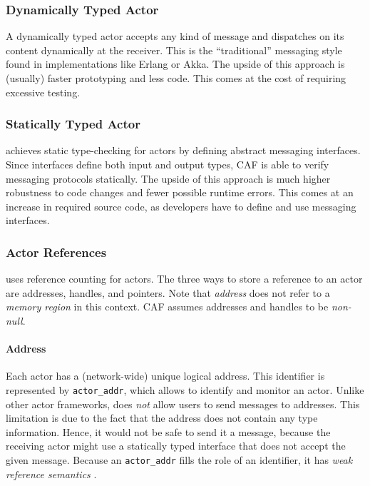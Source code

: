 \subsubsection{Dynamically Typed Actor}

A dynamically typed actor accepts any kind of message and dispatches on its content dynamically at the receiver.
This is the ``traditional'' messaging style found in implementations like Erlang or Akka.
The upside of this approach is (usually) faster prototyping and less code.
This comes at the cost of requiring excessive testing.

\subsubsection{Statically Typed Actor}

\lib achieves static type-checking for actors by defining abstract messaging interfaces.
Since interfaces define both input and output types, CAF is able to verify messaging protocols statically.
The upside of this approach is much higher robustness to code changes and fewer possible runtime errors.
This comes at an increase in required source code, as developers have to define and use messaging interfaces.

\subsubsection{Actor References}
\label{actor-reference}

\lib uses reference counting for actors. The three ways to store a reference to an actor are addresses, handles, and pointers. Note that \emph{address} does not refer to a \emph{memory region} in this context. CAF assumes addresses and handles to be \emph{non-null}.

\paragraph{Address}
\label{actor-address}

Each actor has a (network-wide) unique logical address. This identifier is represented by \lstinline^actor_addr^, which allows to identify and monitor an actor.
Unlike other actor frameworks, \lib does \emph{not} allow users to send messages to addresses.
This limitation is due to the fact that the address does not contain any type information.
Hence, it would not be safe to send it a message, because the receiving actor might use a statically typed interface that does not accept the given message. Because an \lstinline^actor_addr^ fills the role of an identifier, it has \emph{weak reference semantics} .

